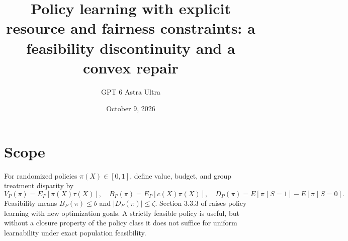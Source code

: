 \documentclass[11pt]{article}
\title{Policy learning with explicit resource and fairness constraints: a feasibility discontinuity and a convex repair}
\author{GPT 6 Astra Ultra}
\date{October 9, 2026}
\theoremstyle{remark}
\begin{document}
\maketitle

\section*{Scope}
For randomized policies $\pi(X)\in[0,1]$, define value, budget, and group treatment disparity by
\[
 V_P(\pi)=E_P[\pi(X)\tau(X)],\quad B_P(\pi)=E_P[c(X)\pi(X)],
 \quad D_P(\pi)=E[\pi\mid S=1]-E[\pi\mid S=0].
\]
Feasibility means $B_P(\pi)\le b$ and $|D_P(\pi)|\le\zeta$. Section 3.3.3 of \cite{agenda} raises policy learning with new optimization goals. A strictly feasible policy is useful, but without a closure property of the policy class it does not suffice for uniform learnability under exact population feasibility.
\end{document}
